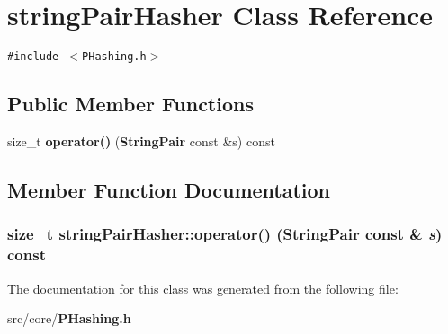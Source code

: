 \section{string\-Pair\-Hasher Class Reference}
\label{classstringPairHasher}
{\tt \#include $<$PHashing.h$>$}

\subsection*{Public Member Functions}
\begin{CompactItemize}
\item 
size\_\-t {\bf operator()} ({\bf String\-Pair} const \&s) const
\end{CompactItemize}


\subsection{Member Function Documentation}
\subsubsection{\setlength{\rightskip}{0pt plus 5cm}size\_\-t string\-Pair\-Hasher::operator() ({\bf String\-Pair} const \& {\em s}) const\hspace{0.3cm}{\tt  [inline]}}\label{classstringPairHasher_8bfb7354daaa763318d981ae88651f27}




The documentation for this class was generated from the following file:\begin{CompactItemize}
\item 
src/core/{\bf PHashing.h}\end{CompactItemize}
